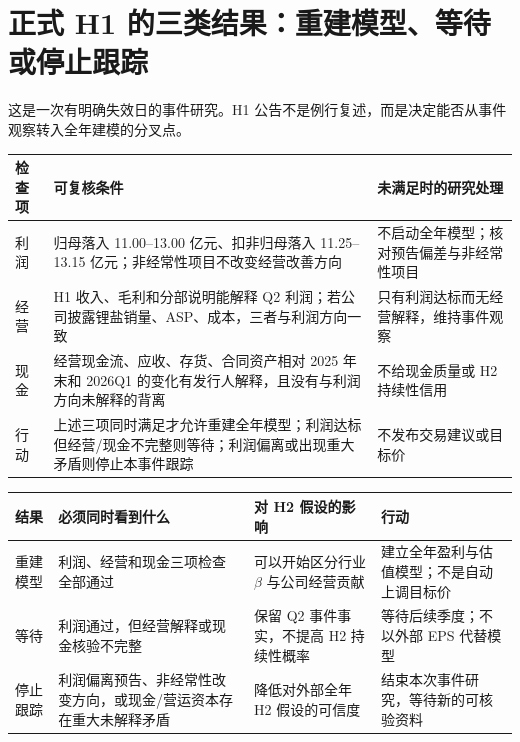 \section{正式 H1 的三类结果：重建模型、等待或停止跟踪}

这是一次有明确失效日的事件研究。H1 公告不是例行复述，而是决定能否从事件观察转入全年建模的分叉点。

\begin{exhibitbox}
\begin{tabularx}{\exhibitboxwidth}{L{2.1cm}X X}
\toprule
检查项 & 可复核条件 & 未满足时的研究处理 \\
\midrule
利润 & 归母落入 11.00--13.00 亿元、扣非归母落入 11.25--13.15 亿元；非经常性项目不改变经营改善方向 & 不启动全年模型；核对预告偏差与非经常性项目 \\
经营 & H1 收入、毛利和分部说明能解释 Q2 利润；若公司披露锂盐销量、ASP、成本，三者与利润方向一致 & 只有利润达标而无经营解释，维持事件观察 \\
现金 & 经营现金流、应收、存货、合同资产相对 2025 年末和 2026Q1 的变化有发行人解释，且没有与利润方向未解释的背离 & 不给现金质量或 H2 持续性信用 \\
行动 & 上述三项同时满足才允许重建全年模型；利润达标但经营/现金不完整则等待；利润偏离或出现重大矛盾则停止本事件跟踪 & 不发布交易建议或目标价 \\
\bottomrule
\end{tabularx}
\end{exhibitbox}

\begin{exhibitbox}[正式 H1 结果矩阵]
\begin{tabularx}{\exhibitboxwidth}{L{2.0cm}X X X}
\toprule
结果 & 必须同时看到什么 & 对 H2 假设的影响 & 行动 \\
\midrule
重建模型 & 利润、经营和现金三项检查全部通过 & 可以开始区分行业 $\beta$ 与公司经营贡献 & 建立全年盈利与估值模型；不是自动上调目标价 \\
等待 & 利润通过，但经营解释或现金核验不完整 & 保留 Q2 事件事实，不提高 H2 持续性概率 & 等待后续季度；不以外部 EPS 代替模型 \\
停止跟踪 & 利润偏离预告、非经常性改变方向，或现金/营运资本存在重大未解释矛盾 & 降低对外部全年 H2 假设的可信度 & 结束本次事件研究，等待新的可核验资料 \\
\bottomrule
\end{tabularx}
\end{exhibitbox}

